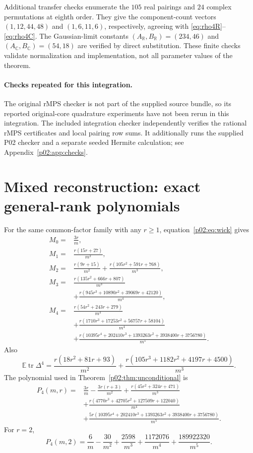 \documentclass[11pt]{article}
\numberwithin{equation}{section}
\theoremstyle{definition}\newtheorem{definition}[theorem]{Definition}
\theoremstyle{remark}\newtheorem{remark}[theorem]{Remark}
\newcommand{\R}{\mathbb R}\newcommand{\E}{\mathbb E}\newcommand{\Prob}{\mathbb P}
\newcommand{\tr}{\operatorname{tr}}\newcommand{\Ent}{\operatorname{Ent}}
\newcommand{\C}{\mathbb C}
\begin{document}
Additional transfer checks enumerate the $105$ real pairings and $24$ complex
permutations at eighth order. They give the component-count vectors
$(1,12,44,48)$ and $(1,6,11,6)$, respectively, agreeing with
\eqref{eq:rho4R}--\eqref{eq:rho4C}. The Gaussian-limit constants
$(A_{\R},B_{\R})=(234,46)$ and $(A_{\C},B_{\C})=(54,18)$ are verified by direct
substitution. These finite checks validate normalization and implementation,
not all parameter values of the theorem.


\paragraph{Checks repeated for this integration.}
The original rMPS checker is not part of the supplied source bundle, so its
reported original-core quadrature experiments have not been rerun in this
integration. The included integration checker independently verifies the
rational rMPS certificates and local pairing row sums. It additionally runs
the supplied P02 checker and a separate seeded Hermite calculation; see
Appendix~\ref{p02:app:checks}.
\clearpage

\section{Mixed reconstruction: exact general-rank polynomials}\label{p02:app:general}
For the same common-factor family with any \(r\ge1\), equation~\eqref{p02:eq:wick} gives
\begin{align*}
 M_0={}&\frac{3r}{m},\\
 M_1={}&\frac{r(15r+27)}{m^2},\\
 M_2={}&\frac{r(9r+15)}{m^2}
       +\frac{r(105r^2+591r+768)}{m^3},\\
 M_3={}&\frac{r(135r^2+666r+807)}{m^3}\\
       &+\frac{r(945r^3+10890r^2+39069r+42120)}{m^4},\\
 M_4={}&\frac{r(54r^2+243r+279)}{m^3}\\
       &+\frac{r(1710r^3+17253r^2+56757r+58104)}{m^4}\\
       &+\frac{r(10395r^4+202410r^3+1393263r^2+3938400r+3756780)}{m^5}.
\end{align*}
Also
\[
 \E\tr \Delta^4=\frac{r(18r^2+81r+93)}{m^2}
 +\frac{r(105r^3+1182r^2+4197r+4500)}{m^3}.
\]
The polynomial used in Theorem~\ref{p02:thm:unconditional} is
\begin{align*}
 P_4(m,r)={}&\frac{3r}{m}-\frac{3r(r+3)}{m^2}
 +\frac{r(45r^2+324r+471)}{m^3}\\
 &+\frac{r(4770r^3+42705r^2+127509r+122040)}{m^4}\\
 &+\frac{5r(10395r^4+202410r^3+1393263r^2+3938400r+3756780)}{m^5}.
\end{align*}
For \(r=2\),
\[
 P_4(m,2)=\frac6m-\frac{30}{m^2}+\frac{2598}{m^3}
 +\frac{1172076}{m^4}+\frac{189922320}{m^5}.
\]
\end{document}
